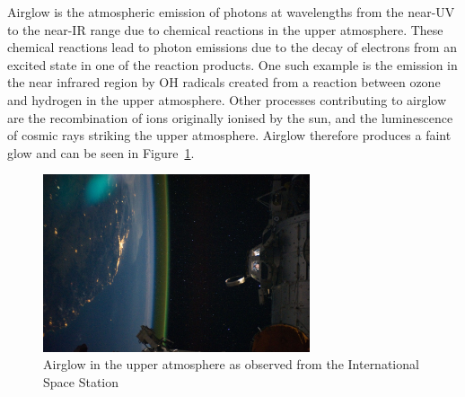 		Airglow is the atmospheric emission of photons at wavelengths from the near-UV to the near-IR range due to chemical reactions in the upper atmosphere\cite[p.~9]{An_atmospheric_radiation_model_for_Cerro_Paranal}. These chemical reactions lead to photon emissions due to the decay of electrons from an excited state in one of the reaction products. One such example is the emission in the near infrared region by OH radicals created from a reaction between ozone and hydrogen in the upper atmosphere\cite[p.~1]{MNRMNR11383}. Other processes contributing to airglow are the recombination of ions originally ionised by the sun, and the luminescence of cosmic rays striking the upper atmosphere. Airglow therefore produces a faint glow and can be seen in Figure~\ref{fig:air_glow_in_upper_atmosphere}.
		\begin{figure}[!htbp]
			\centering
			\includegraphics[width=0.7\textwidth]{../Images/airglow_in_upper_atmosphere.jpeg}
			\caption{Airglow in the upper atmosphere as observed from the International Space Station\cite{ISS028_E_050185}}\label{fig:air_glow_in_upper_atmosphere}
		\end{figure}

